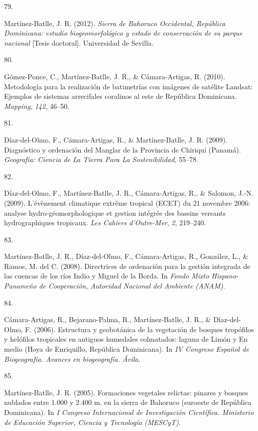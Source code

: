 \documentclass[10pt,a4paper,]{article}
\newlength{\cslhangindent}
\newlength{\csllabelwidth}
\newcommand{\CSLLeftMargin}[1]{\parbox[t]{\csllabelwidth}{\hfill #1~}}
\newcommand{\CSLRightInline}[1]{\parbox[t]{\linewidth - \cslhangindent - \csllabelwidth}{#1}\vspace{0.8ex}}
\begin{document}
\leavevmode\hypertarget{ref-batlle2012sierra}{}%
\CSLLeftMargin{79. }
\CSLRightInline{Martínez-Batlle, J. R. (2012). \emph{Sierra de Bahoruco
Occidental, República Dominicana: estudio biogeomorfológico y estado de
conservación de su parque nacional} {[}Tesis doctoral{]}. Universidad de
Sevilla.}

\leavevmode\hypertarget{ref-ponce2010metodologia}{}%
\CSLLeftMargin{80. }
\CSLRightInline{Gómez-Ponce, C., Martínez-Batlle, J. R., \&
Cámara-Artigas, R. (2010). Metodología para la realización de
batimetrías con imágenes de satélite Landsat: Ejemplos de sistemas
arrecifales coralinos al este de República Dominicana. \emph{Mapping},
\emph{142}, 46--50.}

\leavevmode\hypertarget{ref-del2009diagnostico}{}%
\CSLLeftMargin{81. }
\CSLRightInline{Díaz-del-Olmo, F., Cámara-Artigas, R., \&
Martínez-Batlle, J. R. (2009). Diagnóstico y ordenación del Manglar de
la Provincia de Chiriquí (Panamá). \emph{Geografía: Ciencia de La Tierra
Para La Sostenibilidad}, 55--78.}

\leavevmode\hypertarget{ref-diaz2009evenement}{}%
\CSLLeftMargin{82. }
\CSLRightInline{Díaz-del-Olmo, F., Martínez-Batlle, J. R.,
Cámara-Artigas, R., \& Salomon, J.-N. (2009). L'évènement climatique
extrême tropical (ECET) du 21 novembre 2006: analyse
hydro-géomorphologique et gestion intégrée des bassins versants
hydrographiques tropicaux. \emph{Les Cahiers d'Outre-Mer}, \emph{2},
219--240.}

\leavevmode\hypertarget{ref-Jose_Ramon_Martinez-Batlle_107991988}{}%
\CSLLeftMargin{83. }
\CSLRightInline{Martínez-Batlle, J. R., Díaz-del-Olmo, F.,
Cámara-Artigas, R., González, L., \& Ramos, M. del C. (2008).
Directrices de ordenación para la gestión integrada de las cuencas de
los ríos Indio y Miguel de la Borda. In \emph{Fondo Mixto
Hispano-Panameño de Cooperación, Autoridad Nacional del Ambiente
(ANAM)}.}

\leavevmode\hypertarget{ref-Jose_Ramon_Martinez-Batlle_107991418}{}%
\CSLLeftMargin{84. }
\CSLRightInline{Cámara-Artigas, R., Bejarano-Palma, R., Martínez-Batlle,
J. R., \& Díaz-del-Olmo, F. (2006). Estructura y geobotánica de la
vegetación de bosques tropófilos y helófilos tropicales en antiguos
humedales colmatados: laguna de Limón y En medio (Hoya de Enriquillo,
República Dominicana). In \emph{IV Congreso Español de Biogeografía.
Avances en biogeografía. Ávila}.}

\leavevmode\hypertarget{ref-Jose_Ramon_Martinez-Batlle_108102758}{}%
\CSLLeftMargin{85. }
\CSLRightInline{Martínez-Batlle, J. R. (2005). Formaciones vegetales
relictas: pinares y bosques nublados entre 1.000 y 2.400 m. en la sierra
de Bahoruco (suroeste de República Dominicana). In \emph{I Congreso
Internacional de Investigación Científica. Ministerio de Educación
Superior, Ciencia y Tecnología (MESCyT)}.}
\end{document}

